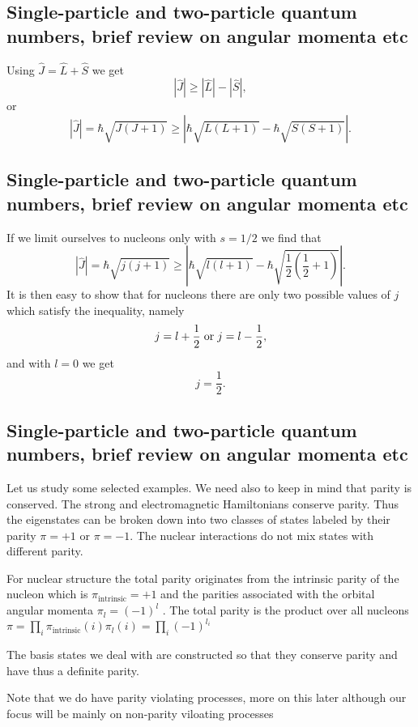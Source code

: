 \documentclass[%
twoside,                 %
final,                   %
10pt]{article}
\begin{document}
\subsection{Single-particle and two-particle quantum numbers, brief review on angular momenta etc}
\begin{block}{}
Using $\hat{J}=\hat{L}+\hat{S}$ we get 
\[
   |\hat{J}| \ge |\hat{L}|-|\hat{S}|,
\]
or
\[
   |\hat{J}|=\hbar\sqrt{J(J+1)}\ge |\hbar\sqrt{L(L+1)}-
   \hbar\sqrt{S(S+1)}|.
\]
\end{block}



\subsection{Single-particle and two-particle quantum numbers, brief review on angular momenta etc}
\begin{block}{}
If we limit ourselves to nucleons only with $s=1/2$ we find that
\[
   |\hat{J}|=\hbar\sqrt{j(j+1)}\ge |\hbar\sqrt{l(l+1)}-
   \hbar\sqrt{\frac{1}{2}(\frac{1}{2}+1)}|.
\]
It is then easy to show that for nucleons there are only two possible values of
$j$ which satisfy the inequality, namely
\[
   j=l+\frac{1}{2}\hspace{0.1cm} \mathrm{or} \hspace{0.1cm}j=l-\frac{1}{2},
\]
and with $l=0$ we get 
\[
   j=\frac{1}{2}.
\]
\end{block}


\subsection{Single-particle and two-particle quantum numbers, brief review on angular momenta etc}
\begin{block}{}
Let us study some selected examples. We need also to keep in mind that parity is conserved.
The strong and electromagnetic Hamiltonians conserve parity. Thus the eigenstates can be
broken down into two classes of states labeled by their parity $\pi= +1$ or $\pi=-1$.
The nuclear interactions do not mix states with different parity.

For nuclear structure the total parity originates
from the intrinsic parity of the nucleon which is $\pi_{\mathrm{intrinsic}}=+1$ 
and the parities associated with
the orbital angular momenta $\pi_l=(-1)^l$ . The total parity is the product over all nucleons
$\pi = \prod_i \pi_{\mathrm{intrinsic}}(i)\pi_l(i) = \prod_i (-1)^{l_i}$

The basis states we deal with are constructed so that they conserve parity and have thus a definite parity. 

Note that we do have parity violating processes, more on this later although our focus will be mainly on non-parity viloating processes
\end{block}
\end{document}
